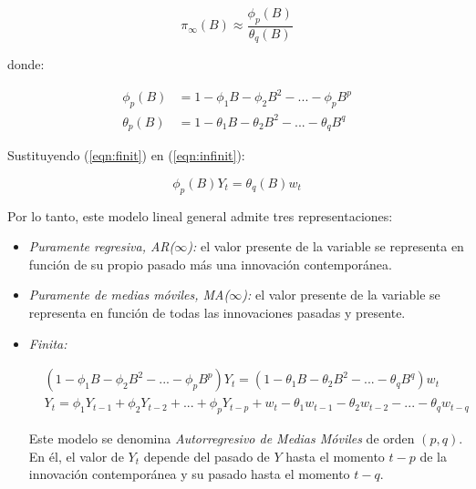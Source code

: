 \documentclass[a4paper,10pt]{article}
\begin{document}
\begin{equation}\label{eqn:finit}
\pi_\infty(B) \approx \frac{\phi_p(B)}{\theta_q(B)}
\end{equation}

donde:

\begin{equation}
\begin{split}
\phi_p(B) &= 1 - \phi_1B - \phi_2B^2 - ... - \phi_pB^p \\
\theta_p(B) &= 1 - \theta_1B - \theta_2B^2 - ... - \theta_qB^q
\end{split}
\end{equation}

Sustituyendo (\ref{eqn:finit}) en (\ref{eqn:infinit}):

\begin{equation}
\phi_p(B) Y_t = \theta_q (B) w_t
\end{equation}

Por lo tanto, este modelo lineal general admite tres representaciones:

\begin{itemize}
 \item \textit{Puramente regresiva, AR($\infty$):} el valor presente de la variable se representa en función de su propio pasado más una innovación contemporánea.

 \item \textit{Puramente de medias móviles, MA($\infty$):} el valor presente de la variable se representa en función de todas las innovaciones pasadas y presente.

 \item \textit{Finita:}

 \begin{equation}\label{eqn:completa}
 \begin{split}
 &(1-\phi_1B - \phi_2B^2 - ... - \phi_pB^p) Y_t = (1-\theta_1B - \theta_2B^2 - ... - \theta_qB^q) w_t \\
 &Y_t = \phi_1Y_{t-1} + \phi_2Y_{t-2} + ... + \phi_pY_{t-p} + w_t -\theta_1w_{t-1} - \theta_2w_{t-2} - ... - \theta_qw_{t-q}
 \end{split}
 \end{equation}

 Este modelo se denomina \textit{Autorregresivo de Medias Móviles} de orden $(p,q)$. En él, el valor de $Y_t$ depende del pasado de $Y$ hasta el momento $t-p$ de la innovación contemporánea y su pasado hasta el momento $t-q$.
\end{itemize}
\end{document}
